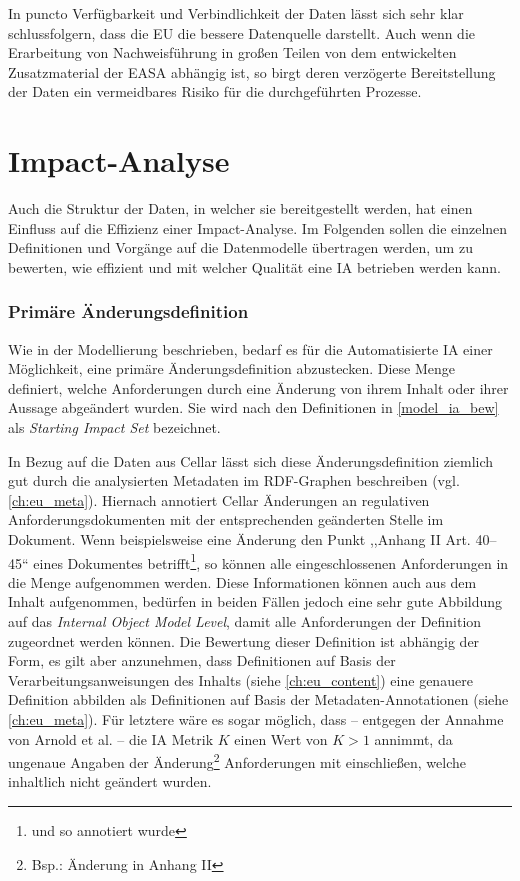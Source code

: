    \medskip
In puncto Verfügbarkeit und Verbindlichkeit der Daten lässt sich sehr klar schlussfolgern, dass die \ac{EU} die bessere Datenquelle darstellt.
Auch wenn die Erarbeitung von Nachweisführung in großen Teilen von dem entwickelten Zusatzmaterial der \ac{EASA} abhängig ist, so birgt deren verzögerte Bereitstellung der Daten ein vermeidbares Risiko für die durchgeführten Prozesse.

\pagebreak
    
    \section{Impact-Analyse}

Auch die Struktur der Daten, in welcher sie bereitgestellt werden, hat einen Einfluss auf die Effizienz einer Impact-Analyse.
Im Folgenden sollen die einzelnen Definitionen und Vorgänge auf die Datenmodelle übertragen werden, um zu bewerten, wie effizient und mit welcher Qualität eine \ac{IA} betrieben werden kann.

\subsubsection{Primäre Änderungsdefinition}

Wie in der Modellierung beschrieben, bedarf es für die Automatisierte \ac{IA} einer Möglichkeit, eine primäre Änderungsdefinition abzustecken. 
Diese Menge definiert, welche Anforderungen durch eine Änderung von ihrem Inhalt oder ihrer Aussage abgeändert wurden.
Sie wird nach den Definitionen in \ref{model_ia_bew}  als \textit{Starting Impact Set}  bezeichnet.

\medskip
In Bezug auf die Daten aus Cellar lässt sich diese Änderungsdefinition ziemlich gut durch die analysierten Metadaten im \ac{RDF}-Graphen beschreiben (vgl. \ref{ch:eu_meta}).
Hiernach annotiert Cellar Änderungen an regulativen Anforderungsdokumenten mit der entsprechenden geänderten Stelle im Dokument.
Wenn beispielsweise eine Änderung den Punkt ,,Anhang II Art. 40--45`` eines Dokumentes betrifft\footnote{und so annotiert wurde}, so können alle eingeschlossenen Anforderungen in die Menge aufgenommen werden.
Diese Informationen können auch aus dem Inhalt aufgenommen, bedürfen in beiden Fällen jedoch eine sehr gute Abbildung auf das \textit{Internal Object Model Level}, damit alle Anforderungen der Definition zugeordnet werden können.
Die Bewertung dieser Definition ist abhängig der Form, es gilt aber anzunehmen, dass Definitionen auf Basis der Verarbeitungsanweisungen des Inhalts (siehe \ref{ch:eu_content}) eine genauere Definition abbilden als Definitionen auf Basis der Metadaten-Annotationen (siehe \ref{ch:eu_meta}). 
Für letztere wäre es sogar möglich, dass -- entgegen der Annahme von Arnold et al. -- die \ac{IA} Metrik $K$ einen Wert von $K > 1$ annimmt, da ungenaue Angaben der Änderung\footnote{Bsp.: Änderung in Anhang II} Anforderungen mit einschließen, welche inhaltlich nicht geändert wurden. 

